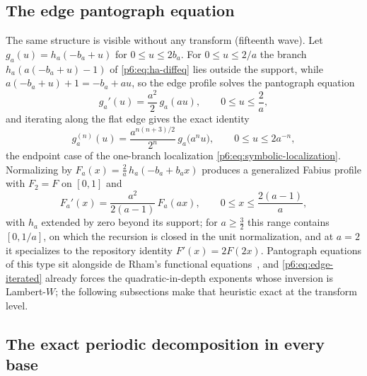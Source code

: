 \documentclass[11pt,oneside]{article}
\numberwithin{equation}{section}
\theoremstyle{definition}
\theoremstyle{remark}
\begin{document}
\subsection{The edge pantograph equation}

The same structure is visible without any transform (fifteenth wave).  Let
$g_a(u)=h_a(-b_a+u)$ for $0\le u\le2b_a$.  For $0\le u\le2/a$ the branch
$h_a(a(-b_a+u)-1)$ of \eqref{p6:eq:ha-diffeq} lies outside the support, while
$a(-b_a+u)+1=-b_a+au$, so the edge profile solves the pantograph equation
\begin{equation}\label{p6:eq:edge-pantograph}
 g_a'(u)=\frac{a^2}{2}\,g_a(au),
 \qquad 0\le u\le\frac2a,
\end{equation}
and iterating along the flat edge gives the exact identity
\begin{equation}\label{p6:eq:edge-iterated}
 g_a^{(n)}(u)=\frac{a^{n(n+3)/2}}{2^n}\,g_a\bigl(a^nu\bigr),
 \qquad 0\le u\le2a^{-n},
\end{equation}
the endpoint case of the one-branch localization
\eqref{p6:eq:symbolic-localization}.  Normalizing by
$F_a(x)=\tfrac2a\,h_a(-b_a+b_ax)$ produces a generalized Fabius profile with
$F_2=F$ on $[0,1]$ and
\begin{equation}\label{p6:eq:Fa-pantograph}
 F_a'(x)=\frac{a^2}{2(a-1)}\,F_a(ax),
 \qquad 0\le x\le\frac{2(a-1)}{a},
\end{equation}
with $h_a$ extended by zero beyond its support; for $a\ge\tfrac32$ this range
contains $[0,1/a]$, on which the recursion is closed in the unit
normalization, and at $a=2$ it specializes to the repository identity
$F'(x)=2F(2x)$.
Pantograph equations of this type sit alongside de Rham's functional
equations~\cite{p6:derham}, and \eqref{p6:eq:edge-iterated} already forces the
quadratic-in-depth exponents whose inversion is Lambert-$W$; the following
subsections make that heuristic exact at the transform level.

\subsection{The exact periodic decomposition in every base}
\end{document}
